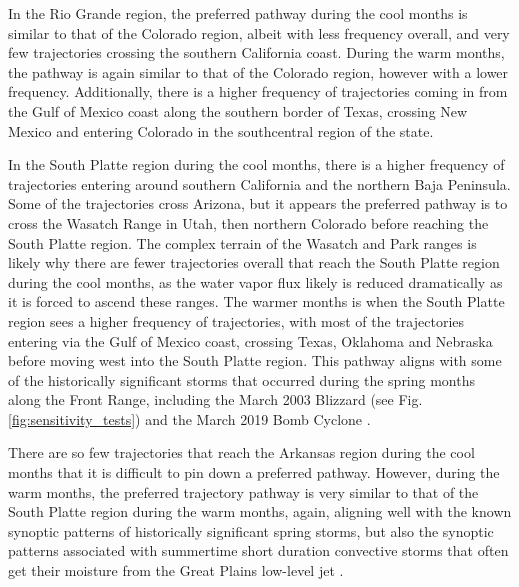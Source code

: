 \documentclass[draft]{agujournal2019}
\begin{document}
In the Rio Grande region, the preferred pathway during the cool months is similar to that of the Colorado region, albeit with less frequency overall, and very few trajectories crossing the southern California coast. During the warm months, the pathway is again similar to that of the Colorado region, however with a lower frequency. Additionally, there is a higher frequency of trajectories coming in from the Gulf of Mexico coast along the southern border of Texas, crossing New Mexico and entering Colorado in the southcentral region of the state. 

In the South Platte region during the cool months, there is a higher frequency of trajectories entering around southern California and the northern Baja Peninsula. Some of the trajectories cross Arizona, but it appears the preferred pathway is to cross the Wasatch Range in Utah, then northern Colorado before reaching the South Platte region. The complex terrain of the Wasatch and Park ranges is likely why there are fewer trajectories overall that reach the South Platte region during the cool months, as the water vapor flux likely is reduced dramatically as it is forced to ascend these ranges. The warmer months is when the South Platte region sees a higher frequency of trajectories, with most of the trajectories entering via the Gulf of Mexico coast, crossing Texas, Oklahoma and Nebraska before moving west into the South Platte region. This pathway aligns with some of the historically significant storms that occurred during the spring months along the Front Range, including the March 2003 Blizzard (see Fig. \ref{fig:sensitivity_tests}) and the March 2019 Bomb Cyclone \cite{Zou2024A2019}. 

There are so few trajectories that reach the Arkansas region during the cool months that it is difficult to pin down a preferred pathway. However, during the warm months, the preferred trajectory pathway is very similar to that of the South Platte region during the warm months, again, aligning well with the known synoptic patterns of historically significant spring storms, but also the synoptic patterns associated with summertime short duration convective storms that often get their moisture from the Great Plains low-level jet \cite{Pu2016DynamicalPrecipitation, Helfand1995ClimatologyStates, Weaver2008VariabilityImpacts, Schubert1998SubseasonalStates}.
\end{document}
